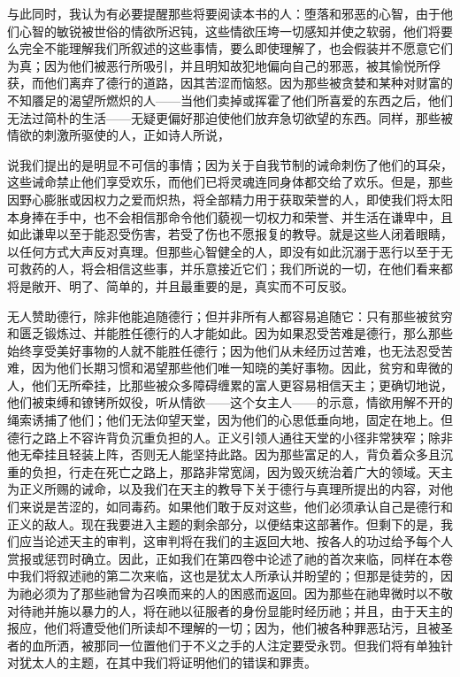 与此同时，我认为有必要提醒那些将要阅读本书的人：堕落和邪恶的心智，由于他们心智的敏锐被世俗的情欲所迟钝，这些情欲压垮一切感知并使之软弱，他们将要么完全不能理解我们所叙述的这些事情，要么即使理解了，也会假装并不愿意它们为真；因为他们被恶行所吸引，并且明知故犯地偏向自己的邪恶，被其愉悦所俘获，而他们离弃了德行的道路，因其苦涩而恼怒。因为那些被贪婪和某种对财富的不知餍足的渴望所燃炽的人——当他们卖掉或挥霍了他们所喜爱的东西之后，他们无法过简朴的生活——无疑更偏好那迫使他们放弃急切欲望的东西。同样，那些被情欲的刺激所驱使的人，正如诗人所说，\par

\par

说我们提出的是明显不可信的事情；因为关于自我节制的诫命刺伤了他们的耳朵，这些诫命禁止他们享受欢乐，而他们已将灵魂连同身体都交给了欢乐。但是，那些因野心膨胀或因权力之爱而炽热，将全部精力用于获取荣誉的人，即使我们将太阳本身捧在手中，也不会相信那命令他们藐视一切权力和荣誉、并生活在谦卑中，且如此谦卑以至于能忍受伤害，若受了伤也不愿报复的教导。就是这些人闭着眼睛，以任何方式大声反对真理。但那些心智健全的人，即没有如此沉溺于恶行以至于无可救药的人，将会相信这些事，并乐意接近它们；我们所说的一切，在他们看来都将是敞开、明了、简单的，并且最重要的是，真实而不可反驳。\par

无人赞助德行，除非他能追随德行；但并非所有人都容易追随它：只有那些被贫穷和匮乏锻炼过、并能胜任德行的人才能如此。因为如果忍受苦难是德行，那么那些始终享受美好事物的人就不能胜任德行；因为他们从未经历过苦难，也无法忍受苦难，因为他们长期习惯和渴望那些他们唯一知晓的美好事物。因此，贫穷和卑微的人，他们无所牵挂，比那些被众多障碍缠累的富人更容易相信天主；更确切地说，他们被束缚和镣铐所奴役，听从情欲——这个女主人——的示意，情欲用解不开的绳索诱捕了他们；他们无法仰望天堂，因为他们的心思低垂向地，固定在地上。但德行之路上不容许背负沉重负担的人。正义引领人通往天堂的小径非常狭窄；除非他无牵挂且轻装上阵，否则无人能坚持此路。因为那些富足的人，背负着众多且沉重的负担，行走在死亡之路上，那路非常宽阔，因为毁灭统治着广大的领域。天主为正义所赐的诫命，以及我们在天主的教导下关于德行与真理所提出的内容，对他们来说是苦涩的，如同毒药。如果他们敢于反对这些，他们必须承认自己是德行和正义的敌人。现在我要进入主题的剩余部分，以便结束这部著作。但剩下的是，我们应当论述天主的审判，这审判将在我们的主返回大地、按各人的功过给予每个人赏报或惩罚时确立。因此，正如我们在第四卷中论述了祂的首次来临，同样在本卷中我们将叙述祂的第二次来临，这也是犹太人所承认并盼望的；但那是徒劳的，因为祂必须为了那些祂曾为召唤而来的人的困惑而返回。因为那些在祂卑微时以不敬对待祂并施以暴力的人，将在祂以征服者的身份显能时经历祂；并且，由于天主的报应，他们将遭受他们所读却不理解的一切；因为，他们被各种罪恶玷污，且被圣者的血所洒，被那同一位置他们于不义之手的人注定要受永罚。但我们将有单独针对犹太人的主题，在其中我们将证明他们的错误和罪责。\par

